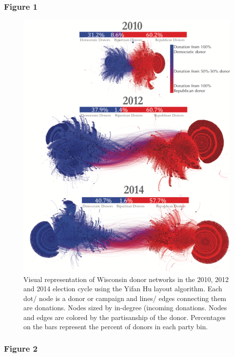 \documentclass[12pt,]{article}
\begin{document}
\hypertarget{figure-1}{%
\subsubsection{Figure 1}\label{figure-1}}

\begin{figure}

{\centering \includegraphics[width=0.73\linewidth]{../figures/fig1} 

}

\caption{Visual representation of Wisconsin donor networks in the 2010, 2012 and 2014 election cycle using the Yifan Hu layout algorithm. Each dot/ node is a donor or campaign and lines/ edges connecting them are donations. Nodes sized by in-degree (incoming donations. Nodes and edges are colored by the partisanship of the donor. Percentages on the bars represent the percent of donors in each party bin.}\label{fig:unnamed-chunk-11}
\end{figure}

\newpage

\hypertarget{figure-2}{%
\subsubsection{Figure 2}\label{figure-2}}
\end{document}
